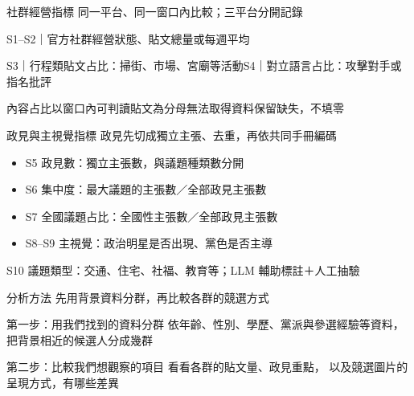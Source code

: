 \documentclass[aspectratio=169,11pt]{beamer}
\newcommand{\subtitleline}[1]{{\color{accent}\large #1}\par\vspace{8mm}}
\newcommand{\point}[1]{{\large #1}\par\vspace{7mm}}
\begin{document}
\begin{frame}{社群經營指標}
\subtitleline{同一平台、同一窗口內比較；三平台分開記錄}
\point{S1--S2｜官方社群經營狀態、貼文總量或每週平均}
\point{S3｜行程類貼文占比：掃街、市場、宮廟等活動\newline S4｜對立語言占比：攻擊對手或指名批評}
\point{內容占比以窗口內可判讀貼文為分母\newline 無法取得資料保留缺失，不填零}
\end{frame}

\begin{frame}{政見與主視覺指標}
\subtitleline{政見先切成獨立主張、去重，再依共同手冊編碼}
\begin{itemize}\setlength{\itemsep}{3mm}
\item S5 政見數：獨立主張數，與議題種類數分開
\item S6 集中度：最大議題的主張數／全部政見主張數
\item S7 全國議題占比：全國性主張數／全部政見主張數
\item S8--S9 主視覺：政治明星是否出現、黨色是否主導
\end{itemize}
\vspace{4mm}
{\small S10 議題類型：交通、住宅、社福、教育等；LLM 輔助標註＋人工抽驗}
\end{frame}

\begin{frame}{分析方法}
\subtitleline{先用背景資料分群，再比較各群的競選方式}
\point{第一步：用我們找到的資料分群\newline
依年齡、性別、學歷、黨派與參選經驗等資料，\newline
把背景相近的候選人分成幾群}
\vspace{3mm}
\point{第二步：比較我們想觀察的項目\newline
看看各群的貼文量、政見重點，\newline
以及競選圖片的呈現方式，有哪些差異}
\end{frame}
\end{document}
